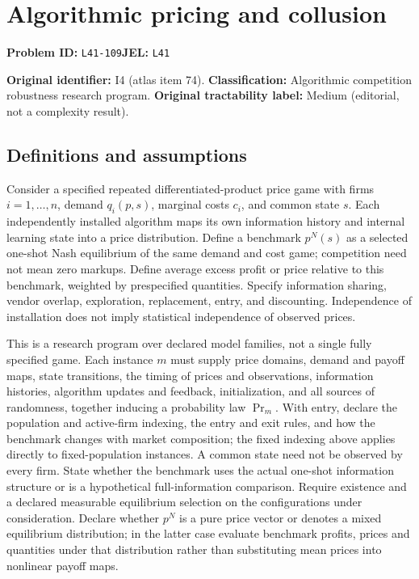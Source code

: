 \documentclass[11pt,a4paper]{article}
\begin{document}
\section*{Algorithmic pricing and collusion}
\textbf{Problem ID:} \texttt{L41-109}\quad \textbf{JEL:} \texttt{L41}\par
\label{problem:OP-0074}
\label{atlas:prob:I4}

\noindent\textbf{Original identifier:} I4 (atlas item 74). \textbf{Classification:} Algorithmic competition robustness research program. \textbf{Original tractability label:} Medium (editorial, not a complexity result).

\subsection*{Definitions and assumptions}

Consider a specified repeated differentiated-product price game with firms $i=1,\ldots,n$, demand $q_i(p,s)$, marginal costs $c_i$, and common state $s$. Each independently installed algorithm maps its own information history and internal learning state into a price distribution. Define a benchmark $p^N(s)$ as a selected one-shot Nash equilibrium of the same demand and cost game; competition need not mean zero markups. Define average excess profit or price relative to this benchmark, weighted by prespecified quantities. Specify information sharing, vendor overlap, exploration, replacement, entry, and discounting. Independence of installation does not imply statistical independence of observed prices.

This is a research program over declared model families, not a single fully specified game. Each instance $m$ must supply price domains, demand and payoff maps, state transitions, the timing of prices and observations, information histories, algorithm updates and feedback, initialization, and all sources of randomness, together inducing a probability law $\Pr_m$. With entry, declare the population and active-firm indexing, the entry and exit rules, and how the benchmark changes with market composition; the fixed indexing above applies directly to fixed-population instances. A common state need not be observed by every firm. State whether the benchmark uses the actual one-shot information structure or is a hypothetical full-information comparison. Require existence and a declared measurable equilibrium selection on the configurations under consideration. Declare whether $p^N$ is a pure price vector or denotes a mixed equilibrium distribution; in the latter case evaluate benchmark profits, prices and quantities under that distribution rather than substituting mean prices into nonlinear payoff maps.
\end{document}
